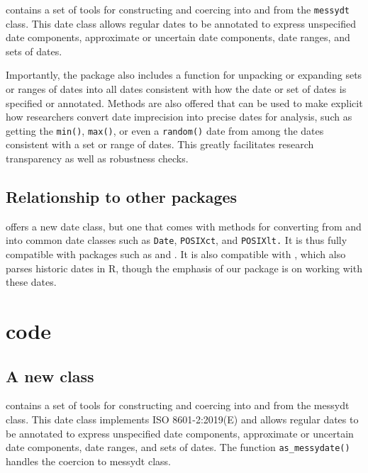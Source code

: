 \documentclass[
]{jss}
\begin{document}
 contains a set of tools for constructing and coercing
into and from the \texttt{messydt} class. This date class allows regular
dates to be annotated to express unspecified date components,
approximate or uncertain date components, date ranges, and sets of
dates.

Importantly, the package also includes a function for unpacking or
expanding sets or ranges of dates into all dates consistent with how the
date or set of dates is specified or annotated. Methods are also offered
that can be used to make explicit how researchers convert date
imprecision into precise dates for analysis, such as getting the
\texttt{min()}, \texttt{max()}, or even a \texttt{random()} date from
among the dates consistent with a set or range of dates. This greatly
facilitates research transparency as well as robustness checks.

\hypertarget{relationship-to-other-packages}{%
\subsection{Relationship to other
packages}\label{relationship-to-other-packages}}

 offers a new date class, but one that comes with
methods for converting from and into common date classes such as
\texttt{Date}, \texttt{POSIXct}, and \texttt{POSIXlt.} It is thus fully
compatible with packages such as 
\citep{grolemundDatesTimesMade2011} and 
\citep{eddelbuettelAnytimeEasierDate2019}. It is also compatible with
, which also parses historic dates in R, though the
emphasis of our package is on working with these dates.

\section[R code]{ code}\label{r-code}

\hypertarget{a-new-class}{%
\subsection{A new class}\label{a-new-class}}

 contains a set of tools for constructing and coercing
into and from the messydt class. This date class implements ISO
8601-2:2019(E) and allows regular dates to be annotated to express
unspecified date components, approximate or uncertain date components,
date ranges, and sets of dates. The function \texttt{as\_messydate()}
handles the coercion to messydt class.
\end{document}
